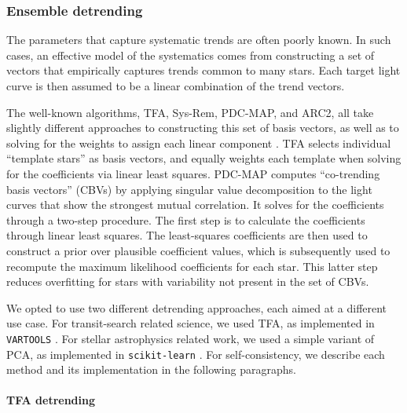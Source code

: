 \documentclass[12pt,twocolumn,tighten]{aastex62}
\begin{document}
\subsubsection{Ensemble detrending}
\label{subsubsec:ensemble}

The parameters that capture systematic trends are often poorly known.
In such cases, an effective model of the systematics comes from
constructing a set of vectors that empirically captures trends common
to many stars.  Each target light curve is then assumed to be a linear
combination of the trend vectors.

The well-known algorithms, TFA, Sys-Rem, PDC-MAP, and ARC2, all take
slightly different approaches to constructing this set of basis
vectors, as well as to solving for the weights to assign each linear
component
\citep{kovacs_trend_2005,tamuz_correcting_2005,smith_pdc_2012,aigrain_robust_2017}.
TFA selects individual ``template stars'' as basis vectors, and
equally weights each template when solving for the coefficients via
linear least squares.  PDC-MAP computes ``co-trending basis vectors''
(CBVs) by applying singular value decomposition to the light curves
that show the strongest mutual correlation.  It solves for the
coefficients through a two-step procedure.  The first step is to
calculate the coefficients through linear least squares.  The
least-squares coefficients are then used to construct a prior over
plausible coefficient values, which is subsequently used to recompute the
maximum likelihood coefficients for each star.  This latter step
reduces overfitting for stars with variability not present in the set
of CBVs.

We opted to use two different detrending approaches, each aimed
at a different use case.  For transit-search related science,
we used TFA, as implemented in \texttt{VARTOOLS}
\citep{kovacs_trend_2005,Hartman_Bakos_2016}.  For stellar
astrophysics related work, we used a simple variant of PCA, as
implemented in \texttt{scikit-learn} \citep{sklearn_2011}.  For
self-consistency, we describe each method and its implementation in
the following paragraphs.

\paragraph{TFA detrending}
\end{document}
